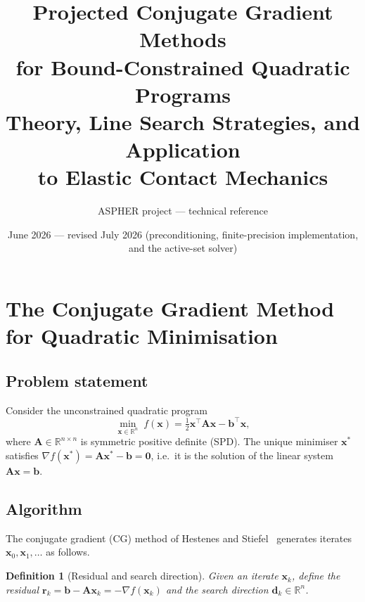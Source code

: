 \documentclass[11pt,a4paper]{article}
\newtheorem{definition}[theorem]{Definition}
\newcommand{\R}{\mathbb{R}}
\newcommand{\bA}{\mathbf{A}}
\newcommand{\bb}{\mathbf{b}}
\newcommand{\br}{\mathbf{r}}
\newcommand{\bd}{\mathbf{d}}
\newcommand{\bx}{\mathbf{x}}
\newcommand{\bzero}{\mathbf{0}}
\newcommand{\tr}{\top}
\begin{document}
\title{\textbf{Projected Conjugate Gradient Methods\\
       for Bound-Constrained Quadratic Programs}\\[0.5em]
       \large Theory, Line Search Strategies, and Application\\
       to Elastic Contact Mechanics}
\author{ASPHER project --- technical reference}
\date{June 2026 --- revised July 2026 (preconditioning, finite-precision
implementation, and the active-set solver)}
\maketitle
\tableofcontents

\section{The Conjugate Gradient Method for Quadratic Minimisation}
\label{sec:cg}

\subsection{Problem statement}

Consider the unconstrained quadratic program
\begin{equation}
  \min_{\bx \in \R^n}\; f(\bx) = \tfrac{1}{2}\bx^\tr \bA \bx - \bb^\tr \bx,
  \label{eq:qp}
\end{equation}
where $\bA \in \R^{n \times n}$ is symmetric positive definite (SPD).
The unique minimiser $\bx^*$ satisfies $\nabla f(\bx^*) = \bA\bx^* - \bb = \bzero$,
i.e.\ it is the solution of the linear system $\bA\bx = \bb$.

\subsection{Algorithm}

The conjugate gradient (CG) method of Hestenes and Stiefel~\cite{HestStief1952}
generates iterates $\bx_0, \bx_1, \ldots$ as follows.

\begin{definition}[Residual and search direction]
  Given an iterate $\bx_k$, define the \emph{residual} $\br_k = \bb - \bA\bx_k = -\nabla f(\bx_k)$
  and the \emph{search direction} $\bd_k \in \R^n$.
\end{definition}
\end{document}
